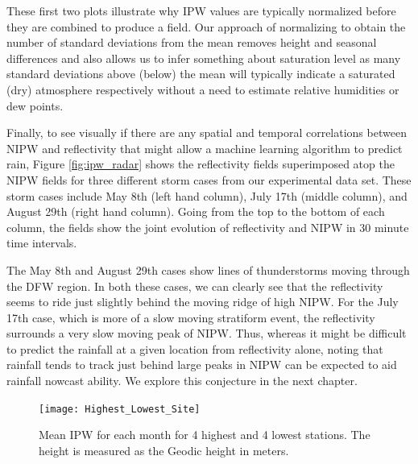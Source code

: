 \documentclass[proposal]{umassthesis}
\begin{document}
{These first two plots illustrate why IPW values are typically normalized before they are combined to produce a field. Our approach of normalizing to obtain the number of standard deviations from the mean removes height and seasonal differences and also allows us to infer something about saturation level as many standard deviations above (below) the mean will typically indicate a saturated (dry) atmosphere respectively without a need to estimate relative humidities or dew points.

Finally, to see visually if there are any spatial and temporal correlations between NIPW and reflectivity that might allow a machine learning algorithm to predict rain, Figure \ref{fig:ipw_radar} shows the reflectivity fields superimposed atop the NIPW fields for three different storm cases from our experimental data set. These storm cases include May 8th (left hand column), July 17th (middle column), and August 29th (right hand column). Going from the top to the bottom of each column, the fields show the joint evolution of reflectivity and NIPW in 30 minute time intervals.

The May 8th and August 29th cases show lines of thunderstorms moving through the DFW region. In both these cases, we can clearly see that the reflectivity seems to ride just slightly behind the moving ridge of high NIPW. For the July 17th case, which is more of a slow moving stratiform event, the reflectivity surrounds a very slow moving peak of NIPW. Thus, whereas it might be difficult to predict the rainfall at a given location from reflectivity alone, noting that rainfall tends to track just behind large peaks in NIPW can be expected to aid rainfall nowcast ability. We explore this conjecture in the next chapter.

\begin{figure}[!t]
\begin{center}
\texttt{[image: Highest\_Lowest\_Site]}
\caption{Mean IPW for each month for 4 highest and 4 lowest stations. The height is measured as the Geodic height in meters.}
\label{fig:Highest_Lowest_Site}
\end{center}
\end{figure}

}
\end{document}
